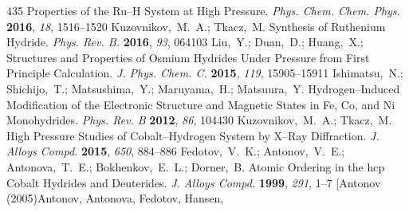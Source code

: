 \documentclass[12pt,letterpaper,oneside]{article}
\begin{document}
\begin{mcitethebibliography}{435}
  Properties of the Ru--H System at High Pressure. \emph{Phys. Chem. Chem.
  Phys.} \textbf{2016}, \emph{18}, 1516--1520\relax
\mciteBstWouldAddEndPuncttrue
\mciteSetBstMidEndSepPunct{\mcitedefaultmidpunct}
{\mcitedefaultendpunct}{\mcitedefaultseppunct}\relax
\EndOfBibitem
{}
Kuzovnikov,~M.~A.; Tkacz,~M. Synthesis of Ruthenium Hydride. \emph{Phys. Rev.
  B.} \textbf{2016}, \emph{93}, 064103\relax
\mciteBstWouldAddEndPuncttrue
\mciteSetBstMidEndSepPunct{\mcitedefaultmidpunct}
{\mcitedefaultendpunct}{\mcitedefaultseppunct}\relax
\EndOfBibitem
{}
Liu,~Y.; Duan,~D.; Huang,~X.;   Structures and
  Properties of Osmium Hydrides Under Pressure from First Principle
  Calculation. \emph{J. Phys. Chem. C.} \textbf{2015}, \emph{119},
  15905--15911\relax
\mciteBstWouldAddEndPuncttrue
\mciteSetBstMidEndSepPunct{\mcitedefaultmidpunct}
{\mcitedefaultendpunct}{\mcitedefaultseppunct}\relax
\EndOfBibitem
{}
Ishimatsu,~N.; Shichijo,~T.; Matsushima,~Y.; Maruyama,~H.; Matsuura,~Y.
    Hydrogen--Induced Modification of the Electronic Structure
  and Magnetic States in Fe, Co, and Ni Monohydrides. \emph{Phys. Rev. B}
  \textbf{2012}, \emph{86}, 104430\relax
\mciteBstWouldAddEndPuncttrue
\mciteSetBstMidEndSepPunct{\mcitedefaultmidpunct}
{\mcitedefaultendpunct}{\mcitedefaultseppunct}\relax
\EndOfBibitem
{}
Kuzovnikov,~M.~A.; Tkacz,~M. High Pressure Studies of Cobalt--Hydrogen System
  by X--Ray Diffraction. \emph{J. Alloys Compd.} \textbf{2015}, \emph{650},
  884--886\relax
\mciteBstWouldAddEndPuncttrue
\mciteSetBstMidEndSepPunct{\mcitedefaultmidpunct}
{\mcitedefaultendpunct}{\mcitedefaultseppunct}\relax
\EndOfBibitem
{}
Fedotov,~V.~K.; Antonov,~V.~E.; Antonova,~T.~E.; Bokhenkov,~E.~L.; Dorner,~B.
    Atomic Ordering in the hcp Cobalt Hydrides and Deuterides.
  \emph{J. Alloys Compd.} \textbf{1999}, \emph{291}, 1--7\relax
\mciteBstWouldAddEndPuncttrue
\mciteSetBstMidEndSepPunct{\mcitedefaultmidpunct}
{\mcitedefaultendpunct}{\mcitedefaultseppunct}\relax
\EndOfBibitem
\bibitem[Antonov (2005)Antonov, Antonova, Fedotov, Hansen,

\end{mcitethebibliography}
\end{document}
